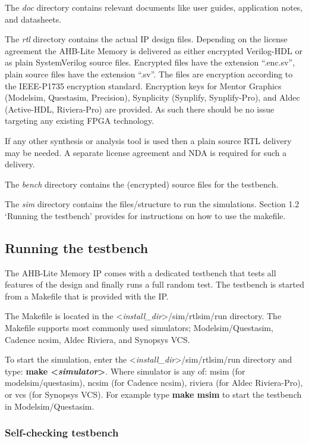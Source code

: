 The \emph{doc} directory contains relevant documents like user guides,
application notes, and datasheets.

The \emph{rtl} directory contains the actual IP design files. Depending
on the license agreement the AHB-Lite Memory is delivered as either
encrypted Verilog-HDL or as plain SystemVerilog source files. Encrypted
files have the extension ``.enc.sv'', plain source files have the
extension ``.sv''. The files are encryption according to the IEEE-P1735
encryption standard. Encryption keys for Mentor Graphics (Modelsim,
Questasim, Precision), Synplicity (Synplify, Synplify-Pro), and Aldec
(Active-HDL, Riviera-Pro) are provided. As such there should be no issue
targeting any existing FPGA technology.

If any other synthesis or analysis tool is used then a plain source RTL
delivery may be needed. A separate license agreement and NDA is required
for such a delivery.

The \emph{bench} directory contains the (encrypted) source files for the
testbench.

The \emph{sim} directory contains the files/structure to run the
simulations. Section 1.2 `Running the testbench' provides for
instructions on how to use the makefile.

\subsection{Running the testbench}\label{running-the-testbench}

The AHB-Lite Memory IP comes with a dedicated testbench that tests all
features of the design and finally runs a full random test. The
testbench is started from a Makefile that is provided with the IP.

The Makefile is located in the
\textless{}\emph{install\_dir}\textgreater{}/sim/rtlsim/run directory.
The Makefile supports most commonly used simulators; Modelsim/Questasim,
Cadence ncsim, Aldec Riviera, and Synopsys VCS.

To start the simulation, enter the
\textless{}\emph{install\_dir}\textgreater{}/sim/rtlsim/run directory
and type: \textbf{make \textless{}\emph{simulator}\textgreater{}}. Where
simulator is any of: msim (for modelsim/questasim), ncsim (for Cadence
ncsim), riviera (for Aldec Riviera-Pro), or vcs (for Synopsys VCS). For
example type \textbf{make msim} to start the testbench in
Modelsim/Questasim.

\subsubsection{Self-checking testbench}\label{self-checking-testbench}

